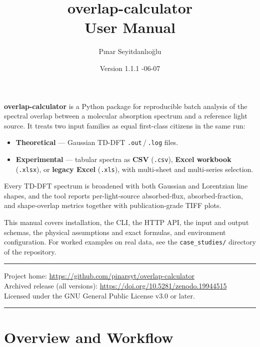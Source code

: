 \documentclass[11pt,a4paper]{article}
\title{\vspace{-1.5cm}%
  \Huge\bfseries overlap-calculator\\[4pt]
  \Large\mdseries User Manual}
\author{Pınar Seyitdanlıoğlu}
\date{Version 1.1.1 \quad\textbullet\quad 2026-06-07}
\begin{document}
\maketitle
\thispagestyle{empty}

\vspace{1em}
\noindent\textbf{overlap-calculator} is a Python package for
reproducible batch analysis of the spectral overlap between a molecular
absorption spectrum and a reference light source. It treats two input
families as equal first-class citizens in the same run:

\begin{itemize}
  \item \textbf{Theoretical} --- Gaussian TD-DFT
        \texttt{.out}\,/\,\texttt{.log} files.
  \item \textbf{Experimental} --- tabular spectra as \textbf{CSV}
        (\texttt{.csv}), \textbf{Excel workbook} (\texttt{.xlsx}), or
        \textbf{legacy Excel} (\texttt{.xls}), with multi-sheet and
        multi-series selection.
\end{itemize}

\noindent Every TD-DFT spectrum is broadened with both Gaussian and
Lorentzian line shapes, and the tool reports per-light-source
absorbed-flux, absorbed-fraction, and shape-overlap metrics together
with publication-grade TIFF plots.

\vspace{0.5em}
\noindent This manual covers installation, the CLI, the HTTP API, the
input and output schemas, the physical assumptions and exact formulas,
and environment configuration. For worked examples on real data, see
the \texttt{case\_studies/} directory of the repository.

\vspace{1.5em}
\hrule
\vspace{0.5em}
\begin{flushleft}
{\small Project home: \url{https://github.com/pinarsyt/overlap-calculator} \\
Archived release (all versions): \url{https://doi.org/10.5281/zenodo.19944515} \\
Licensed under the GNU General Public License v3.0 or later.}
\end{flushleft}
\vspace{0.5em}
\hrule

\clearpage
\tableofcontents
\clearpage

\section{Overview and Workflow}
\end{document}
